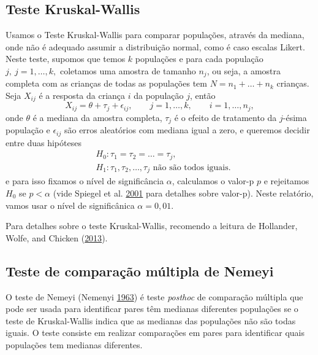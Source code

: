 \documentclass[]{article}
\begin{document}
\hypertarget{teste-kruskal-wallis}{%
\subsection{Teste Kruskal-Wallis}\label{teste-kruskal-wallis}}

Usamos o Teste Kruskal-Wallis para comparar populações, através da mediana, onde não é adequado assumir a distribuição normal, como é caso escalas Likert. Neste teste, supomos que temos \(k\) populações e para cada população \(j,\ j=1, \dots, k,\) coletamos uma amostra de tamanho \(n_j\), ou seja, a amostra completa com as crianças de todas as populações tem \(N = n_1 + \dots + n_k\) crianças. Seja \(X_{ij}\) é a resposta da criança \(i\) da população \(j\), então
\[
X_{ij} = \theta + \tau_j + \epsilon_{ij}, \qquad  j=1, \dots, k,\qquad i=1, \dots, n_j,
\]
onde \(\theta\) é a mediana da amostra completa, \(\tau_j\) é o efeito de tratamento da \(j\)-ésima população e \(\epsilon_{ij}\) são erros aleatórios com mediana igual a zero, e queremos decidir entre duas hipóteses
\[
\begin{split}
&H_0: \tau_1 = \tau_2 = \dots = \tau_j,\\
&H_1: \tau_1, \tau_2, \dots,  \tau_j \mbox{ não são todos iguais}.
\end{split}
\]
e para isso fixamos o nível de significância \(\alpha\), calculamos o valor-p \(p\) e rejeitamos \(H_0\) se \(p < \alpha\) (vide Spiegel et al. \protect\hyperlink{ref-spiegel2001probability}{2001} para detalhes sobre valor-p). Neste relatório, vamos usar o nível de significânica \(\alpha=0,01\).

Para detalhes sobre o teste Kruskal-Wallis, recomendo a leitura de Hollander, Wolfe, and Chicken (\protect\hyperlink{ref-hollander2013nonparametric}{2013}).

\hypertarget{teste-de-comparauxe7uxe3o-muxfaltipla-de-nemeyi}{%
\subsection{Teste de comparação múltipla de Nemeyi}\label{teste-de-comparauxe7uxe3o-muxfaltipla-de-nemeyi}}

O teste de Nemeyi (Nemenyi \protect\hyperlink{ref-nemenyi1963distribution}{1963}) é teste \emph{posthoc} de comparação múltipla que pode ser usada para identificar pares têm medianas diferentes populações se o teste de Kruskal-Wallis indica que as medianas das populações não são todas iguais. O teste consiste em realizar comparações em pares para identificar quais populações tem medianas diferentes.
\end{document}
